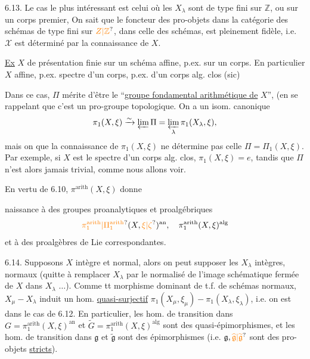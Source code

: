 6.13. Le cas le plus intéressant est celui où les $X_\lambda$ sont de type
 fini sur $\mathbb{Z}$, ou sur un corps
premier,  On sait que le foncteur
 des pro-objets dans la catégorie des schémas de type fini
sur $\unsure{Z|\mathbb Z}$, dans celle des schémas, est pleinement fidèle, i.e.
$\mathscr{X}$ est déterminé par la connaissance de $X$.

\uline{Ex} $X$ de présentation finie sur un schéma affine, p.ex. sur un
corps. En particulier $X$ affine, p.ex.  spectre d'un
corps, p.ex. d'un corps alg. clos (sic)

Dans ce cas, $\Pi$ mérite d'être  le
``\uline{groupe fondamental arithmétique de} $X$'',
(en se rappelant que c'est un  pro-groupe topologique.
On a un isom. canonique
\[
\pi_1(X,\xi)\xrightarrow{\sim}\varprojlim\Pi
=\varprojlim_\lambda\pi_1(X_\lambda,\xi),
\]
mais on   que la connaissance de $\pi_1(X,\xi)$ ne
détermine pas celle  
 $\Pi=\Pi_1(X,\xi)$.
Par exemple, si $X$ est le spectre d'un corps alg. clos,
$\pi_1(X,\xi)=e$, tandis que $\Pi$ n'est alors jamais trivial, comme
nous allons voir.

En vertu de 6.10, $\pi^{\mathrm{arith}}(X,\xi)$
donne

naissance à des groupes proanalytiques et proalgébriques
\[
\unsure{\pi_1^{\mathrm{arith}}|\Pi_1^{\mathrm{arith}}}(X,\unsure{\xi|\zeta})^{\mathrm{an}},\quad
\pi_1^{\mathrm{arith}}(X,\xi)^{\mathrm{alg}}
\]
et à des proalgèbres de Lie correspondantes.

6.14. Supposons $X$ intègre et normal, alors on peut supposer les
$X_\lambda$ intègres, normaux (quitte à  remplacer $X_\lambda$
par le normalisé de l'image schématique fermée de $X$ dans $X_\lambda$
$\ldots$). 
Comme  tt morphisme dominant de t.f. de schémas normaux,
$X_\mu\mathbin{-}X_\lambda$ induit un  hom.
\uline{quasi-surjectif}
$\pi_1(X_\mu,\xi_\mu)\mathbin{-}\pi_1(X_\lambda,\xi_\lambda)$,
i.e. on est dans le cas de 6.12. En particulier, les  hom.
de transition dans \deleted{$\unsure{\Pi}$}
$G=\pi_1^{\mathrm{arith}}(X,\xi)^{\mathrm{an}}$ et
$\widetilde{G}=\pi_1^{\mathrm{arith}}(X,\xi)^{\mathrm{alg}}$ sont des
quasi-épimorphismes, et les hom. de transition dans $\mathfrak{g}$ et
$\widetilde{\mathfrak{g}}$ sont des épimorphismes (i.e.
$\mathfrak{g},\unsure{\widehat{\mathfrak{g}}|\widetilde{\mathfrak{g}}}$
sont des pro-objets \uline{stricts}).

